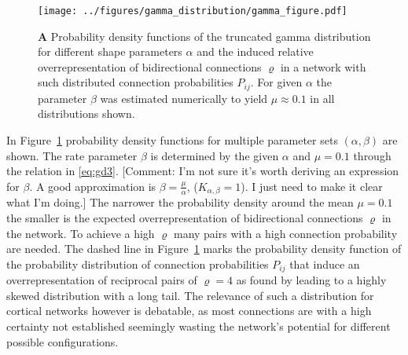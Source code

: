 \begin{figure}[h!]
\centering
\texttt{[image: ../figures/gamma\_distribution/gamma\_figure.pdf]}
\caption{\textbf{A} Probability density functions of the truncated gamma distribution for different shape parameters $\alpha$ and the induced relative overrepresentation of bidirectional connections $\varrho$ in a network with such distributed connection probabilities $P_{ij}$. For given $\alpha$ the parameter $\beta$ was estimated numerically to yield $\mu \approx 0.1$ in all distributions shown.}
\label{fig:gd}
\end{figure}

In Figure~\ref{fig:gd} probability density functions for multiple parameter sets $(\alpha, \beta)$ are shown. The rate parameter $\beta$ is determined by the given $\alpha$ and $\mu = 0.1$ through the relation in \eqref{eq:gd3}. [Comment: I'm not sure it's worth deriving an expression for $\beta$. A good approximation is $\beta = \frac{\mu}{\alpha}$, ($K_{\alpha,\beta} = 1$). I just need to make it clear what I'm doing.]
The narrower the probability density around the mean $\mu = 0.1$ the smaller is the expected overrepresentation of bidirectional connections $\varrho$ in the network. To achieve a high $\varrho$ many pairs with a high connection probability are needed. The dashed line in Figure~\ref{fig:gd} marks the probability density function of the probability distribution of connection probabilities $P_{ij}$ that induce an overrepresentation of reciprocal pairs of $\varrho = 4$ as found by \textcite{Song2005} leading to a highly skewed distribution with a long tail. The relevance of such a distribution for cortical networks however is debatable, as most connections are with a high certainty not established seemingly wasting the network's potential for different possible configurations.






